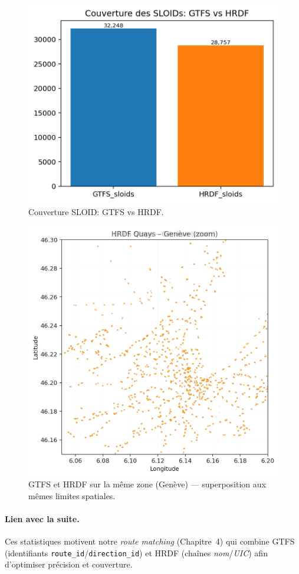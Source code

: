 \begin{figure}[h]
  \centering
  \includegraphics[width=.65\linewidth]{figures/plots/sloid_coverage_gtfs_hrdf.png}
  \caption[Couverture SLOID: GTFS vs HRDF]{Couverture SLOID: GTFS vs HRDF.}
\end{figure}

\begin{figure}[h]
  \centering
  \includegraphics[width=.65\linewidth]{figures/plots/gtfs_hrdf_geneva_overlay.png}
  \caption[GTFS et HRDF à Genève]{GTFS et HRDF sur la même zone (Genève) — superposition aux mêmes limites spatiales.}
  \label{fig:gtfs_hrdf_geneva_overlay}
\end{figure}

\paragraph{Lien avec la suite.} Ces statistiques motivent notre \textit{route matching} (Chapitre~4) qui combine GTFS (identifiants \texttt{route\_id}/\texttt{direction\_id}) et HRDF (chaînes \textit{nom}/\textit{UIC}) afin d’optimiser précision et couverture.

